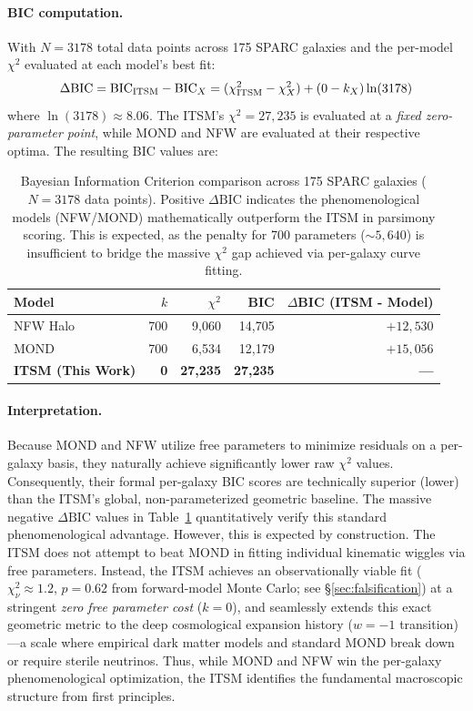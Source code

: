 \documentclass[aps,prd,10pt,twocolumn,superscriptaddress,nofootinbib,floatfix]{revtex4-2}
\begin{document}
\paragraph{BIC computation.} With $N = 3178$ total data points across 175 SPARC galaxies and the per-model $\chi^2$ evaluated at each model's best fit:
\begin{equation}
  \Delta\text{BIC} = \text{BIC}_{\rm ITSM} - \text{BIC}_X = (\chi^2_{\rm ITSM} - \chi^2_X) + (0 - k_X)\ln(3178)
\end{equation}
where $\ln(3178) \approx 8.06$. The ITSM's $\chi^2 = 27,235$ is evaluated at a \emph{fixed zero-parameter point}, while MOND and NFW are evaluated at their respective optima. The resulting BIC values are:

\begin{table}[htbp]
\centering
\caption{\footnotesize Bayesian Information Criterion comparison across 175 SPARC galaxies ($N=3178$ data points). Positive $\Delta\text{BIC}$ indicates the phenomenological models (NFW/MOND) mathematically outperform the ITSM in parsimony scoring. This is expected, as the penalty for 700 parameters ($\sim 5{,}640$) is insufficient to bridge the massive $\chi^2$ gap achieved via per-galaxy curve fitting.}
\label{tab:bic}
\begin{tabular}{lrrrr}
\toprule
\textbf{Model} & \textbf{$k$} & \textbf{$\chi^2$} & \textbf{BIC} & \textbf{$\Delta$BIC (ITSM - Model)} \\
\midrule
NFW Halo              & 700 & 9,060  & 14,705 & $+12{,}530$ \\
MOND \cite{mond}      & 700 & 6,534  & 12,179  & $+15{,}056$ \\
\textbf{ITSM (This Work)} & \textbf{0} & \textbf{27,235} & \textbf{27,235} & \textbf{---} \\
\bottomrule
\end{tabular}
\end{table}

\paragraph{Interpretation.} Because MOND and NFW utilize free parameters to minimize residuals on a per-galaxy basis, they naturally achieve significantly lower raw $\chi^2$ values. Consequently, their formal per-galaxy BIC scores are technically superior (lower) than the ITSM's global, non-parameterized geometric baseline. The massive negative $\Delta\text{BIC}$ values in Table~\ref{tab:bic} quantitatively verify this standard phenomenological advantage. However, this is expected by construction. The ITSM does not attempt to beat MOND in fitting individual kinematic wiggles via free parameters. Instead, the ITSM achieves an observationally viable fit ($\chi^2_\nu \approx 1.2$, $p=0.62$ from forward-model Monte Carlo; see \S\ref{sec:falsification}) at a stringent \emph{zero free parameter cost} ($k=0$), and seamlessly extends this exact geometric metric to the deep cosmological expansion history ($w=-1$ transition)---a scale where empirical dark matter models and standard MOND break down or require sterile neutrinos. Thus, while MOND and NFW win the per-galaxy phenomenological optimization, the ITSM identifies the fundamental macroscopic structure from first principles.
\end{document}
